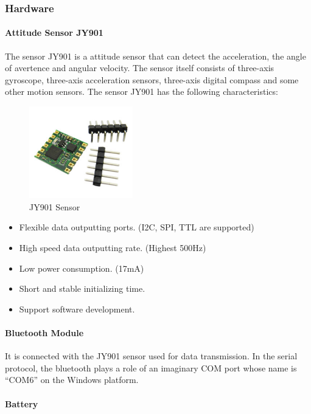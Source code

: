 \subsubsection{Hardware}
\paragraph{Attitude Sensor JY901}

The sensor JY901 is a attitude sensor that can detect the
acceleration, the angle of avertence and angular velocity. The sensor itself
consists of three-axis gyroscope, three-axis acceleration sensors, three-axis
digital compass and some other motion sensors. The sensor JY901 has the
following characteristics: 


\begin{figure}[H]
\centering
\includegraphics[width=0.4\textwidth]{Pics/imu}
\caption{JY901 Sensor}
\label{matcherStep1}
\end{figure}

\begin{itemize}
\item Flexible data outputting ports. (I2C, SPI, TTL are supported)
\item High speed data outputting rate. (Highest 500Hz)
\item Low power consumption. (17mA)
\item Short and stable initializing time. 
\item Support software development. 
\end{itemize}
\paragraph{Bluetooth Module}

It is connected with the JY901 sensor used for data transmission. In the serial
protocol, the bluetooth plays a role of an imaginary COM port whose name is
“COM6” on the Windows platform. 


\paragraph{Battery}

